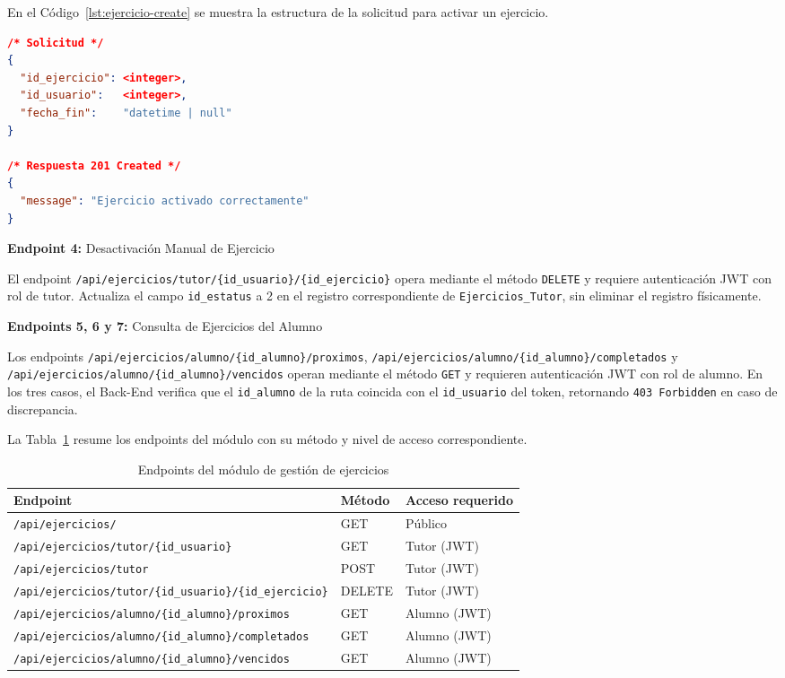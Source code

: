 En el Código~\ref{lst:ejercicio-create} se muestra la estructura de la solicitud para activar un ejercicio.

\begin{lstlisting}[language=json, caption={Payload de solicitud del endpoint de activación de ejercicio}, label={lst:ejercicio-create}]
/* Solicitud */
{
  "id_ejercicio": <integer>,
  "id_usuario":   <integer>,
  "fecha_fin":    "datetime | null"
}

/* Respuesta 201 Created */
{
  "message": "Ejercicio activado correctamente"
}
\end{lstlisting}

\textbf{Endpoint 4:} Desactivación Manual de Ejercicio

El endpoint \texttt{/api/ejercicios/tutor/\{id\_usuario\}/\{id\_ejercicio\}}
opera mediante el método \texttt{DELETE} y requiere autenticación JWT con
rol de tutor. Actualiza el campo \texttt{id\_estatus} a 2 en el registro
correspondiente de \texttt{Ejercicios\_Tutor}, sin eliminar el registro
físicamente.

\textbf{Endpoints 5, 6 y 7:} Consulta de Ejercicios del Alumno

Los endpoints \texttt{/api/ejercicios/alumno/\{id\_alumno\}/proximos},
\texttt{/api/ejercicios/alumno/\{id\_alumno\}/completados} y
\texttt{/api/ejercicios/alumno/\{id\_alumno\}/vencidos} operan mediante
el método \texttt{GET} y requieren autenticación JWT con rol de alumno.
En los tres casos, el Back-End verifica que el \texttt{id\_alumno} de la
ruta coincida con el \texttt{id\_usuario} del token, retornando
\texttt{403 Forbidden} en caso de discrepancia.

La Tabla~\ref{tab:endpoints-ejercicios} resume los endpoints del módulo
con su método y nivel de acceso correspondiente.

\begin{table}[H]
\centering
\caption{Endpoints del módulo de gestión de ejercicios}
\label{tab:endpoints-ejercicios}
\begin{tabular}{|l|l|l|}
\hline
\textbf{Endpoint} & \textbf{Método} & \textbf{Acceso requerido} \\
\hline
\texttt{/api/ejercicios/}
    & GET    & Público \\
\texttt{/api/ejercicios/tutor/\{id\_usuario\}}
    & GET    & Tutor (JWT) \\
\texttt{/api/ejercicios/tutor}
    & POST   & Tutor (JWT) \\
\texttt{/api/ejercicios/tutor/\{id\_usuario\}/\{id\_ejercicio\}}
    & DELETE & Tutor (JWT) \\
\texttt{/api/ejercicios/alumno/\{id\_alumno\}/proximos}
    & GET    & Alumno (JWT) \\
\texttt{/api/ejercicios/alumno/\{id\_alumno\}/completados}
    & GET    & Alumno (JWT) \\
\texttt{/api/ejercicios/alumno/\{id\_alumno\}/vencidos}
    & GET    & Alumno (JWT) \\
\hline
\end{tabular}
\end{table}
